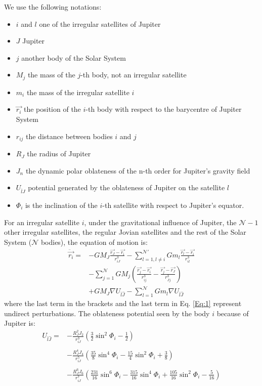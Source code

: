 \documentclass[useAMS,usenatbib]{mn2e}
\begin{document}
We use the following notations: \begin{itemize}
\item $i$ and $l$ one of the irregular satellites of Jupiter
\item $J$ Jupiter 
\item $j$ another body of the Solar System
\item $M_j$ the mass of the $j$-th body, not an irregular satellite
\item $m_i$ the mass of the irregular satellite $i$
\item $\vec{r_i}$ the position of the $i$-th body with respect to the barycentre of Jupiter System
\item $r_{ij}$ the distance between bodies $i$ and $j$  
\item $R_J$ the radius of Jupiter
\item $J_n$ the dynamic polar oblateness of the n-th order for Jupiter's gravity field
\item $U_{\bar{l}\hat{J}}$ potential generated by the oblateness of Jupiter on the satellite $l$
\item $\Phi_i$ is the inclination of the $i$-th satellite with respect to Jupiter's equator.
\end{itemize}

For an irregular satellite $i$, under the gravitational influence of Jupiter, the $\mathcal{N}-1$ other irregular satellites, the regular Jovian satellites and the rest of the Solar System ($\mathcal{N}$ bodies), the equation of motion is:
\begin{equation}\begin{array}{ll}

\ddot{\vec{r_i}}= & \displaystyle -GM_J\frac{\vec{r_J}-\vec{r_i}}{r_{iJ}^3}-\sum_{l=1,l\neq i}^\mathcal{N'}Gm_l\frac{\vec{r_l}-\vec{r_i}}{r_{il}^3}\\
&\displaystyle -\sum_{j=1}^\mathcal{N}GM_j \left(\frac{\vec{r_j}-\vec{r_i}}{r_{ij}^3} - \frac{\vec{r_j}-\vec{r_J}}{r_{Jj}^3} \right)\\
 & \displaystyle +GM_J \nabla U_{\bar{l}\hat{J}} -\sum_{l=1}^\mathcal{N} Gm_l\nabla U_{\bar{l}\hat{J}}
\end{array}
\label{Eq:1}
\end{equation}
where the last term in the brackets and the last term in Eq. \ref{Eq:1} represent undirect perturbations. The oblateness potential seen by the body $i$ because of Jupiter is:
\begin{equation}\begin{array}{ll}

U_{\bar{l}\hat{J}}=&\displaystyle -\frac{R_J^2 J_2}{r_{iJ}^3}\left(\frac{3}{2}\sin^2 \Phi_i-\frac{1}{2}\right)\\ &\\ & 
\displaystyle-\frac{R_J^4 J_4}{r_{iJ}^5}\left(\frac{35}{8}\sin^4 \Phi_i-\frac{15}{4}\sin^2 \Phi_i+\frac{3}{8}\right)\\
& \\
&\displaystyle-\frac{R_J^6 J_6}{r_{iJ}^7}\left(\frac{231}{16}\sin^6 \Phi_i-\frac{315}{16}\sin^4 \Phi_i+\frac{105}{16}\sin^2 \Phi_i-\frac{5}{16}\right)

\end{array}
\end{equation}
\end{document}
